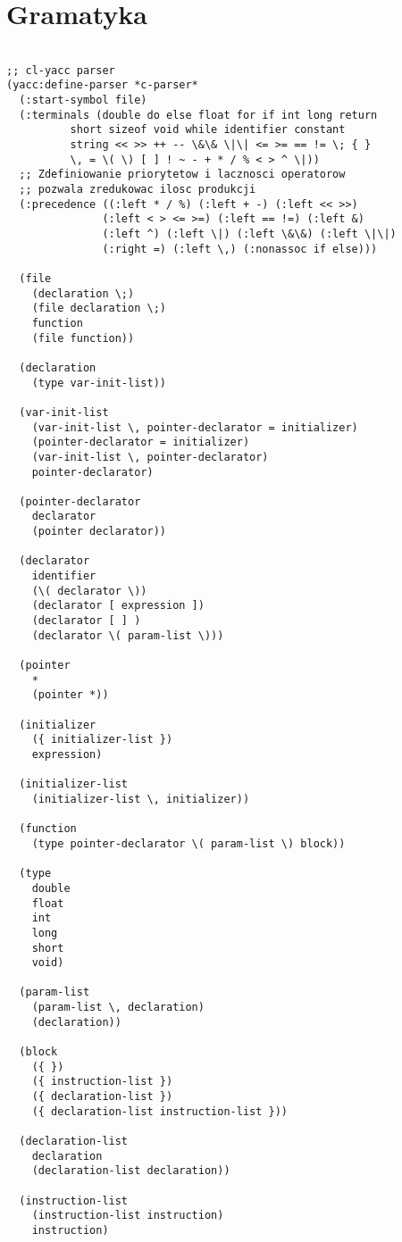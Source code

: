 \documentclass[11pt,a4paper]{article}
\begin{document}
\section{Gramatyka}
\begin{lstlisting}

;; cl-yacc parser
(yacc:define-parser *c-parser*
  (:start-symbol file)
  (:terminals (double do else float for if int long return 
	      short sizeof void while identifier constant
	      string << >> ++ -- \&\& \|\| <= >= == != \; { }
	      \, = \( \) [ ] ! ~ - + * / % < > ^ \|))
  ;; Zdefiniowanie priorytetow i lacznosci operatorow
  ;; pozwala zredukowac ilosc produkcji
  (:precedence ((:left * / %) (:left + -) (:left << >>)
               (:left < > <= >=) (:left == !=) (:left &)
               (:left ^) (:left \|) (:left \&\&) (:left \|\|)
               (:right =) (:left \,) (:nonassoc if else)))

  (file 
    (declaration \;)
    (file declaration \;)
    function
    (file function))
  
  (declaration
    (type var-init-list))
  
  (var-init-list
    (var-init-list \, pointer-declarator = initializer)
    (pointer-declarator = initializer)
    (var-init-list \, pointer-declarator)
    pointer-declarator)
  
  (pointer-declarator
    declarator
    (pointer declarator))
  
  (declarator
    identifier
    (\( declarator \))
    (declarator [ expression ])
    (declarator [ ] )
    (declarator \( param-list \)))
  
  (pointer
    *
    (pointer *))
  
  (initializer
    ({ initializer-list })
    expression)
  
  (initializer-list
    (initializer-list \, initializer))
  
  (function
    (type pointer-declarator \( param-list \) block))
  
  (type 
    double
    float
    int
    long
    short
    void)
  
  (param-list
    (param-list \, declaration)
    (declaration))
  
  (block
    ({ })
    ({ instruction-list })
    ({ declaration-list })
    ({ declaration-list instruction-list }))
  
  (declaration-list
    declaration
    (declaration-list declaration))
  
  (instruction-list
    (instruction-list instruction)
    instruction)
  

\end{lstlisting}
\end{document}
